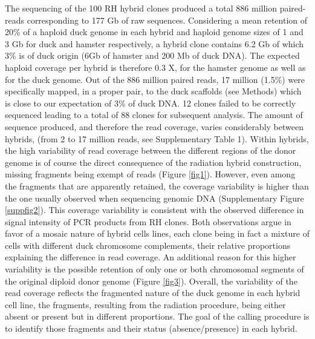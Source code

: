 \documentclass[10pt,letterpaper]{article}
\begin{document}
The sequencing of the 100 RH hybrid clones produced a total 886 million paired-reads corresponding to 177 Gb of raw sequences. 
Considering a mean retention of 20\% of a haploid duck genome in each hybrid and haploid genome sizes of 1 and 3 Gb for duck and hamster respectively, a hybrid clone contains 6.2 Gb of which 3\% is of duck origin (6Gb of hamster and 200 Mb of duck DNA). 
The expected haploid coverage per hybrid is therefore 0.3 X, for the hamster genome as well as for the duck genome. 
Out of the 886 million paired reads, 17 million (1.5\%) were specifically mapped, in a proper pair, to the duck scaffolds (see Methods) which is close to our expectation of 3\% of duck DNA. 12 clones failed to be correctly sequenced leading to a total of 88 clones for subsequent analysis.
The amount of sequence produced, and therefore the read coverage, varies considerably between hybrids, (from 2 to 17 million reads, see Supplementary Table 1). 
Within hybrids, the high variability of read coverage between the different regions of the donor genome is of course the direct consequence of the radiation hybrid construction, missing fragments being exempt of reads (Figure \ref{fig1}). 
However, even among the fragments that are apparently retained, the coverage variability is higher than the one usually observed when sequencing genomic DNA (Supplementary Figure \ref{suppfig2}). 
This coverage variability is consistent with the observed difference in signal intensity of PCR products from RH clones. 
Both observations argue in favor of a mosaic nature of hybrid cells lines, each clone being in fact a mixture of cells with different duck chromosome complements, their relative proportions explaining the difference in read coverage. An additional reason for this higher variability is the possible retention of only one or both chromosomal segments of the original diploid donor genome (Figure \ref{fig3}).
Overall, the variability of the read coverage reflects the fragmented nature of the duck genome in each hybrid cell line, the fragments, resulting from the radiation procedure, being either absent or present but in different proportions. The goal of the calling procedure is to identify those fragments and their status (absence/presence) in each hybrid. 
\end{document}
